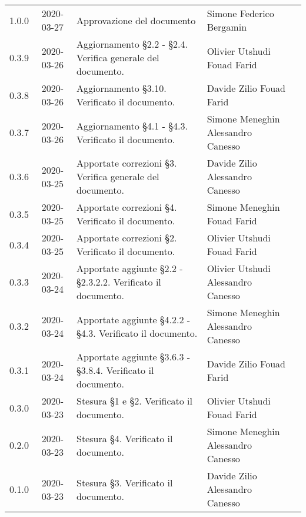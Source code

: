 {\begin{longtable}{ c c  C{4cm}  C{3.8cm}  C{3cm} }
    1.0.0 & 2020-03-27 & Approvazione del documento & Simone Federico Bergamin &\Res{} \\
    	0.3.9 & 2020-03-26 & Aggiornamento \S 2.2 - \S 2.4. Verifica generale del documento. & Olivier Utshudi \newline Fouad Farid &\adm{} \newline  \ver{}\\
		0.3.8 & 2020-03-26 & Aggiornamento \S 3.10. Verificato il documento.& Davide Zilio \newline Fouad Farid &\adm{} \newline  \ver{}\\
		0.3.7 & 2020-03-26 & Aggiornamento \S 4.1 - \S 4.3. Verificato il documento.  & Simone Meneghin \newline Alessandro Canesso &\adm{} \newline  \ver{}\\
		0.3.6 & 2020-03-25 & Apportate correzioni \S 3. Verifica generale del documento.  & Davide Zilio \newline Alessandro Canesso &\adm{} \newline  \ver{}\\
    	0.3.5 & 2020-03-25 & Apportate correzioni \S 4. Verificato il documento. & Simone Meneghin \newline Fouad Farid &\adm{} \newline  \ver{}\\	
   		0.3.4 & 2020-03-25 & Apportate correzioni \S 2. Verificato il documento.& Olivier Utshudi \newline Fouad Farid &\adm{} \newline  \ver{}\\
		0.3.3 & 2020-03-24 & Apportate aggiunte \S 2.2 - \S 2.3.2.2. Verificato il documento. & Olivier Utshudi \newline Alessandro Canesso &\adm{} \newline  \ver{}\\
		0.3.2 & 2020-03-24 & Apportate aggiunte \S 4.2.2 - \S 4.3. Verificato il documento. & Simone Meneghin \newline Alessandro Canesso &\adm{} \newline  \ver{}\\		
		0.3.1 & 2020-03-24 & Apportate aggiunte \S 3.6.3 - \S 3.8.4. Verificato il documento. & Davide Zilio \newline Fouad Farid &\adm{} \newline  \ver{}\\
		0.3.0 & 2020-03-23 & Stesura \S 1 e \S 2. Verificato il documento. & Olivier Utshudi \newline Fouad Farid &\adm{} \newline  \ver{}\\
		0.2.0 & 2020-03-23 & Stesura \S 4. Verificato il documento. & Simone Meneghin \newline Alessandro Canesso &\adm{} \newline  \ver{}\\
		0.1.0 & 2020-03-23 & Stesura \S 3. Verificato il documento. & Davide Zilio \newline Alessandro Canesso &\adm{} \newline  \ver{}\\		
	\end{longtable}
}